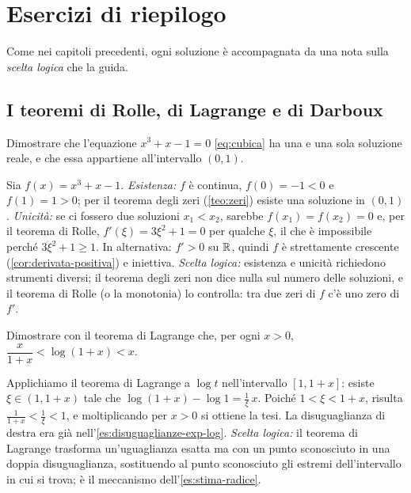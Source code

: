 \section{Esercizi di riepilogo}
\label{sec:esercizi-cap6}

Come nei capitoli precedenti, ogni soluzione è accompagnata da una nota sulla
\emph{scelta logica} che la guida.

\subsection*{I teoremi di Rolle, di Lagrange e di Darboux}

\begin{esercizio}\label{es:cubica-unica}
Dimostrare che l'equazione $x^{3}+x-1=0$ \eqref{eq:cubica} ha una e una sola soluzione
reale, e che essa appartiene all'intervallo $(0,1)$.
\begin{soluzione}
Sia $f(x)=x^{3}+x-1$. \emph{Esistenza:} $f$ è continua, $f(0)=-1<0$ e $f(1)=1>0$; per il
teorema degli zeri (\cref{teo:zeri}) esiste una soluzione in $(0,1)$. \emph{Unicità:} se
ci fossero due soluzioni $x_{1}<x_{2}$, sarebbe $f(x_{1})=f(x_{2})=0$ e, per il teorema di
Rolle, $f'(\xi)=3\xi^{2}+1=0$ per qualche $\xi$, il che è impossibile perché
$3\xi^{2}+1\ge1$. In alternativa: $f'>0$ su $\mathbb{R}$, quindi $f$ è strettamente crescente
(\cref{cor:derivata-positiva}) e iniettiva. \emph{Scelta logica:} esistenza e unicità
richiedono strumenti diversi; il teorema degli zeri non dice nulla sul numero delle
soluzioni, e il teorema di Rolle (o la monotonia) lo controlla: tra due zeri di $f$ c'è
uno zero di $f'$.
\end{soluzione}
\end{esercizio}

\begin{esercizio}\label{es:log-lagrange}
Dimostrare con il teorema di Lagrange che, per ogni $x>0$,
$\dfrac{x}{1+x}<\log(1+x)<x$.
\begin{soluzione}
Applichiamo il teorema di Lagrange a $\log t$ nell'intervallo $[1,1+x]$: esiste
$\xi\in(1,1+x)$ tale che $\log(1+x)-\log1=\frac1\xi\,x$. Poiché $1<\xi<1+x$, risulta
$\frac1{1+x}<\frac1\xi<1$, e moltiplicando per $x>0$ si ottiene la tesi. La
disuguaglianza di destra era già nell'\cref{es:disuguaglianze-exp-log}.
\emph{Scelta logica:} il teorema di Lagrange trasforma un'uguaglianza esatta ma con un
punto sconosciuto in una doppia disuguaglianza, sostituendo al punto sconosciuto gli
estremi dell'intervallo in cui si trova; è il meccanismo dell'\cref{es:stima-radice}.
\end{soluzione}
\end{esercizio}

